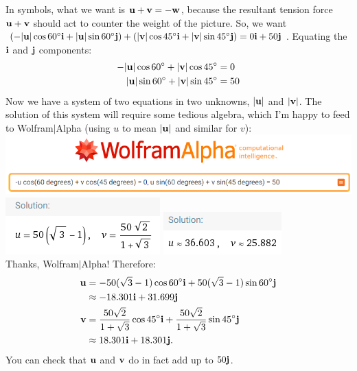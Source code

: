 \begin{enumerate}[leftmargin=0pt]
\begin{enumerate}
        \begin{red}
        In symbols, what we want is $\mathbf{u} + \mathbf{v} = -\mathbf{w}$, because the resultant tension force $\mathbf{u} + \mathbf{v}$ should act to counter the weight of the picture.
        So, we want $(-|\mathbf{u}|\cos60^\circ \mathbf{i} + |\mathbf{u}|\sin60^\circ \mathbf{j}) + (|\mathbf{v}|\cos45^\circ \mathbf{i} + |\mathbf{v}|\sin45^\circ \mathbf{j}) = 0 \mathbf{i} + 50 \mathbf{j}$. Equating the $\mathbf{i}$ and $\mathbf{j}$ components:
        \begin{align*}
            -|\mathbf{u}|\cos60^\circ + |\mathbf{v}|\cos45^\circ &= 0 \\
             |\mathbf{u}|\sin60^\circ + |\mathbf{v}|\sin45^\circ &= 50
        \end{align*}
        Now we have a system of two equations in two unknowns, $|\mathbf{u}|$ and $|\mathbf{v}|$. The solution of this system will require some tedious algebra, which I'm happy to feed to Wolfram$|$Alpha (using $u$ to mean $|\mathbf{u}|$ and similar for $v$):
        \\
        \includegraphics[width=\linewidth]{../images/9-2-16-wa-1.png} \\
        \includegraphics[width=0.4\linewidth]{../images/9-2-16-wa-2.png}
        \includegraphics[width=0.4\linewidth]{../images/9-2-16-wa-3.png}\\
        Thanks, Wolfram$|$Alpha! Therefore:
        \begin{align*}
            \mathbf{u} &= - 50(\sqrt{3} - 1) \cos60^\circ \mathbf{i} + 50(\sqrt{3} - 1) \sin60^\circ \mathbf{j}\\
            &\approx -18.301 \mathbf{i} + 31.699 \mathbf{j} \\
            \mathbf{v} &= \frac{50\sqrt{2}}{1+\sqrt{3}}\cos45^\circ\mathbf{i} + \frac{50\sqrt{2}}{1+\sqrt{3}}\sin45^\circ\mathbf{j}\\
            &\approx 18.301 \mathbf{i} + 18.301 \mathbf{j}.
        \end{align*}
        You can check that $\mathbf{u}$ and $\mathbf{v}$ do in fact add up to $50\mathbf{j}$.
        \end{red}
    \end{enumerate}
    

\end{enumerate}
